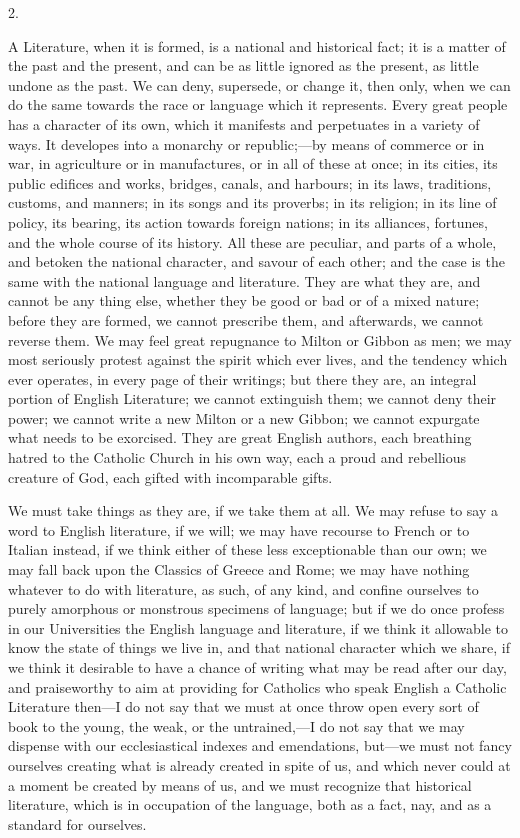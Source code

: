 2.

A Literature, when it is formed, is a national and historical fact;
it is a matter of the past and the present, and can be as little
ignored as the present, as little undone as the past. We can deny,
supersede, or change it, then only, when we can do the same towards
the race or language which it represents. Every great people has a
character of its own, which it manifests and perpetuates in a variety
of ways. It developes into a monarchy or republic;—by means of
commerce or in war, in agriculture or in manufactures, or in all of
these at once; in its cities, its public edifices and works, bridges,
canals, and harbours; in its laws, traditions, customs, and manners;
in its songs and its proverbs; in its religion; in its line of
policy, its bearing, its action towards foreign nations; in its
alliances, fortunes, and the whole course of its history. All these
are peculiar, and parts of a whole, and betoken the national
character, and savour of each other; and the case is the same with the
national language and literature. They are what they are, and cannot
be any thing else, whether they be good or bad or of a mixed nature;
before they are formed, we cannot prescribe them, and afterwards, we
cannot reverse them. We may feel great repugnance to Milton or Gibbon
as men; we may most seriously protest against the spirit which ever
lives, and the tendency which ever operates, in every page of their
writings; but there they are, an integral portion of English
Literature; we cannot extinguish them; we cannot deny their power; we
cannot write a new Milton or a new Gibbon; we cannot expurgate what
needs to be exorcised. They are great English authors, each breathing
hatred to the Catholic Church in his own way, each a proud and
rebellious creature of God, each gifted with incomparable gifts.

We must take things as they are, if we take them at all. We may
refuse to say a word to English literature, if we will; we may have
recourse to French or to Italian instead, if we think either of these
less exceptionable than our own; we may fall back upon the Classics of
Greece and Rome; we may have nothing whatever to do with literature,
as such, of any kind, and confine ourselves to purely amorphous or
monstrous specimens of language; but if we do once profess in our
Universities the English language and literature, if we think it
allowable to know the state of things we live in, and that national
character which we share, if we think it desirable to have a chance of
writing what may be read after our day, and praiseworthy to aim at providing for Catholics who speak English a Catholic Literature
then—I do not say that we must at once throw open every sort of book
to the young, the weak, or the untrained,—I do not say that we may
dispense with our ecclesiastical indexes and emendations, but—we
must not fancy ourselves creating what is already created in spite of
us, and which never could at a moment be created by means of us, and
we must recognize that historical literature, which is in occupation
of the language, both as a fact, nay, and as a standard for ourselves.

